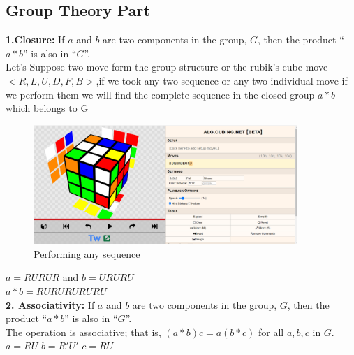 \documentclass{article}
\begin{document}
\subsection{Group Theory Part}
\textbf{1.Closure:} If $a$ and $b$ are two components in the group, $G$, then the product “$a * b$” is also in “$G$”.\\
Let's Suppose two move form the group structure or the rubik's cube move $< R , L , U , D , F , B  >$,if we took any two sequence or any two individual move if we perform them we will find the complete sequence in the closed group $ a * b $ which belongs to G\\
\begin{figure}[h!]
    \centering
    \includegraphics[width = 10cm ]{Screenshot 2023-07-06 000454.png}
    \caption{Performing any sequence}
    \label{fig:Rubiks Cube}
\end{figure}
$a = RURUR $ and $b = URURU$\\
$a * b = RURUR URURU $\\
\textbf{2. Associativity:} If $a$ and $b$ are two components in the group, $G$, then the product “$a * b$” is also in “$G$”.\\ The operation is associative; that is, $(a * b)c = a(b * c)$ for
all $a, b, c$ in $G$.\\
$ a = RU $
$ b = R'U' $
$c = R U$\\
\end{document}
